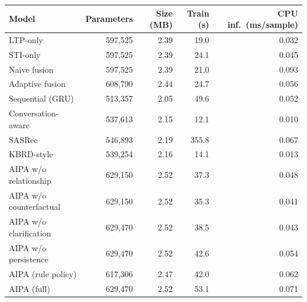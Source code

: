 \begin{tabular}{lrrrr}
\toprule
Model & Parameters & Size (MB) & Train (s) & CPU inf.\ (ms/sample) \\
\midrule
LTP-only & 597,525 & 2.39 & 19.0 & 0.032 \\
STI-only & 597,525 & 2.39 & 24.1 & 0.045 \\
Naive fusion & 597,525 & 2.39 & 21.0 & 0.093 \\
Adaptive fusion & 608,790 & 2.44 & 24.7 & 0.056 \\
Sequential (GRU) & 513,357 & 2.05 & 49.6 & 0.052 \\
Conversation-aware & 537,613 & 2.15 & 12.1 & 0.010 \\
SASRec & 546,893 & 2.19 & 355.8 & 0.067 \\
KBRD-style & 539,254 & 2.16 & 14.1 & 0.013 \\
AIPA w/o relationship & 629,150 & 2.52 & 37.3 & 0.048 \\
AIPA w/o counterfactual & 629,150 & 2.52 & 35.3 & 0.041 \\
AIPA w/o clarification & 629,470 & 2.52 & 38.5 & 0.043 \\
AIPA w/o persistence & 629,470 & 2.52 & 42.6 & 0.054 \\
AIPA (rule policy) & 617,306 & 2.47 & 42.0 & 0.062 \\
AIPA (full) & 629,470 & 2.52 & 53.1 & 0.071 \\
\bottomrule
\end{tabular}
